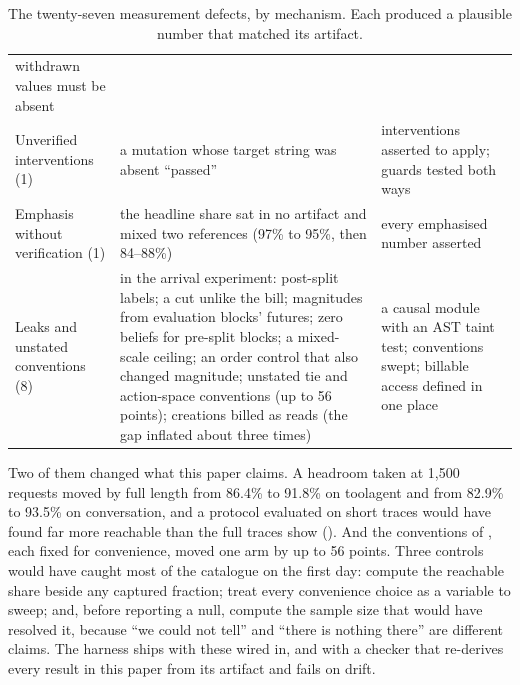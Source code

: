 \begin{table}[t]
\begin{tabular}{@{}p{3.2cm}p{8.6cm}p{4.9cm}@{}}
withdrawn values must be absent \\
Unverified interventions (1) & a mutation whose target string was absent ``passed'' & interventions
asserted to apply; guards tested both ways \\
Emphasis without verification (1) & the headline share sat in no artifact and mixed two references
(97\% to 95\%, then 84--88\%) & every emphasised number asserted \\
Leaks and unstated conventions (8) & in the arrival experiment: post-split labels; a cut unlike the bill;
magnitudes from evaluation blocks' futures; zero beliefs for pre-split blocks; a mixed-scale ceiling; an
order control that also changed magnitude; unstated tie and action-space conventions (up to 56 points);
creations billed as reads (the gap inflated about three times) & a causal module with an AST taint test;
conventions swept; billable access defined in one place \\
\bottomrule
\end{tabular}
\caption{The twenty-seven measurement defects, by mechanism. Each produced a plausible number that matched
its artifact.}
\label{tab:defects}
\end{table}

Two of them changed what this paper claims. A headroom taken at 1{,}500 requests moved by full length
from 86.4\% to 91.8\% on toolagent and from 82.9\% to 93.5\% on conversation, and a protocol evaluated
on short traces would have found far more reachable than the full traces show ().
And the conventions of , each fixed for convenience, moved one arm by up to 56 points.
Three controls would have caught most of the catalogue on the first day: compute the reachable share
beside any captured fraction; treat every convenience choice as a variable to sweep; and, before
reporting a null, compute the sample size that would have resolved it, because ``we could not tell'' and
``there is nothing there'' are different claims. The harness ships with these wired in, and with a
checker that re-derives every result in this paper from its artifact and fails on drift.

